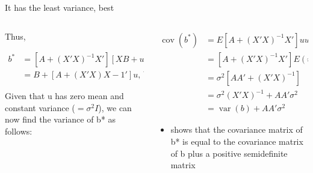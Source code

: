 \documentclass[australian,ignorenonframetext,aspectratio=169]{beamer}
\providecommand{\tightlist}{%
  \setlength{\itemsep}{0pt}\setlength{\parskip}{0pt}}
\begin{document}
\begin{frame}{It has the least variance, best}
\protect\hypertarget{it-has-the-least-variance-best-1}{}

\begin{columns}[T]
\begin{column}{0.5\textwidth}
\small

Thus,

\[
\begin{aligned}
b^*&=\left[A+(X'X)^{-1} X \prime\right][X B+u], \text{substituting for } (y) \\
&=B+[A+(X'X) X-1 \prime] u \text{, because } A X=0
\end{aligned}
\]

Given that u has zero mean and constant variance (\(=\sigma^2I\)), we
can now find the variance of b* as follows:
\end{column}

\begin{column}{0.5\textwidth}
\small

\[
\begin{aligned}
\operatorname{cov}\left(b^*\right)&=E\left[A+(X \prime X)^{-1} X \prime\right] u u \prime\left[A+(X \prime X)^{-1} X^{\prime}\right] \prime \\
&=\left[A+(X \prime X)^{-1} X \prime\right] E(u u \prime)\left[A+(X \prime X)^{-1} X \prime\right] \prime \\
&=\sigma^2\left[A A \prime+(X \prime X)^{-1}\right] \\
&=\sigma^2(X \prime X)^{-1}+A A \prime \sigma^2 \\
&=\operatorname{var}(b)+A A \prime \sigma^2
\end{aligned}
\]

\begin{itemize}
\tightlist
\item
  shows that the covariance matrix of b* is equal to the covariance
  matrix of b plus a positive semidefinite matrix
\end{itemize}
\end{column}
\end{columns}

\end{frame}
\end{document}
